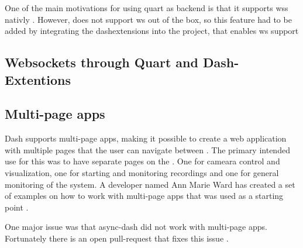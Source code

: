 One of the main motivations for using \gls{quart} as backend is that it supports \glspl{ws} nativly \cite{quartUsingWebsocketsQuart}.
However, \dash does not support \gls{ws} out of the box, so this feature had to be added by integrating the \gls{dashextensions} into the project, that enables \gls{ws} support \cite{eriksenDashExtensionsWebSocket}

\subsection{Websockets through Quart and Dash-Extentions}
\cite{plotlyLiveUpdatesDash}








\subsection{Multi-page apps}
Dash supports multi-page apps, making it possible to create a web application with multiple pages that the user can navigate between \cite{plotlyMultiPageAppsURL}.
The primary intended use for this was to have separate pages on the \srgui.
One for cameara control and visualization, one for starting and monitoring recordings and one for general monitoring of the system.
A developer named Ann Marie Ward has created a set of examples on how to work with multi-page apps that was used as a starting point \cite{wardExamplesMultipageApps03Jul22}.

One major issue was that \gls{async-dash} did not work with multi-page apps.
Fortunately there is an open pull-request that fixes this issue \cite{lekAddFlaskRequest2022}.

